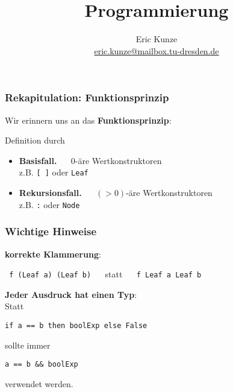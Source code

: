 \documentclass[aspectratio=1610,onlymath, ngerman]{beamer}
\title{Programmierung}%
\subtitle{Übung #1: #2}%
\author{Eric Kunze \\ \url{eric.kunze@mailbox.tu-dresden.de} }%
\date{#3}%
\renewcommand{\emph}[1]{\textbf{#1}}
\begin{document}
    \maketitle
    
    \begin{frame}\frametitle{Rekapitulation: Funktionsprinzip}
    \normalsize
    	Wir erinnern uns an das \emph{Funktionsprinzip}: \\ \medskip
    	
    	Definition durch \\
    	\smallskip
    	\begin{itemize}
    		\item \emph{Basisfall.} $\quad$ $0$-äre Wertkonstruktoren \\
    		z.B. \texttt{[ \enskip ]} oder \texttt{Leaf} 
    		\medskip
    		\item \emph{Rekursionsfall.} $\quad$ $(>0)$-äre Wertkonstruktoren \\
    		z.B. \texttt{:} oder \texttt{Node}
    	\end{itemize}
    \end{frame}

    \begin{frame}\frametitle{Wichtige Hinweise}
    \normalsize
   		\emph{korrekte Klammerung}:
   		\begin{center}
   			\texttt{ f (Leaf a) (Leaf b)} $\quad$ statt $\quad$ \texttt{f Leaf a Leaf b}
   		\end{center}
   		
   		\bigskip
   		
	    \emph{Jeder Ausdruck hat einen Typ}: \\ \smallskip
   		Statt 
   		\begin{center}
   			\texttt{if a == b then boolExp else False}
   		\end{center}
   		sollte immer 
   		\begin{center}
   			\texttt{a == b \&\& boolExp}
   		\end{center}
		verwendet werden.
		\bigskip
		
    \end{frame}
\end{document}
